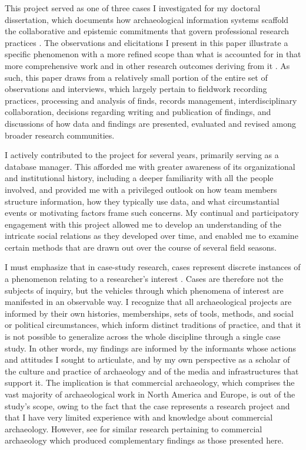 \documentclass{article}
\begin{document}
This project served as one of three cases I investigated for my doctoral
dissertation, which documents how archaeological information systems
scaffold the collaborative and epistemic commitments that govern
professional research practices \parencite{batist2023a}. The observations
and elicitations I present in this paper illustrate a specific
phenomenon with a more refined scope than what is accounted for in that
more comprehensive work and in other research outcomes deriving from it
\parencites[cf.][]{batist2021}{batist2024a}{batist-alienation}. As such,
this paper draws from a relatively small portion of the entire set of
observations and interviews, which largely pertain to fieldwork
recording practices, processing and analysis of finds, records
management, interdisciplinary collaboration, decisions regarding writing
and publication of findings, and discussions of how data and findings
are presented, evaluated and revised among broader research communities.

I actively contributed to the project for several years, primarily
serving as a database manager. This afforded me with greater awareness
of its organizational and institutional history, including a deeper
familiarity with all the people involved, and provided me with a
privileged outlook on how team members structure information, how they
typically use data, and what circumstantial events or motivating factors
frame such concerns. My continual and participatory engagement with this
project allowed me to develop an understanding of the intricate social
relations as they developed over time, and enabled me to examine certain
methods that are drawn out over the course of several field seasons.

I must emphasize that in case-study research, cases represent discrete
instances of a phenomenon relating to a researcher's interest
\parencite{ragin1992}. Cases are therefore not the subjects of inquiry,
but the vehicles through which phenomena of interest are manifested in
an observable way. I recognize that all archaeological projects are
informed by their own histories, memberships, sets of tools, methods,
and social or political circumstances, which inform distinct traditions
of practice, and that it is not possible to generalize across the whole
discipline through a single case study. In other words, my findings are
informed by the informants whose actions and attitudes I sought to
articulate, and by my own perspective as a scholar of the culture and
practice of archaeology and of the media and infrastructures that
support it. The implication is that commercial archaeology, which
comprises the vast majority of archaeological work in North America and
Europe, is out of the study's scope, owing to the fact that the case
represents a research project and that I have very limited experience
with and knowledge about commercial archaeology. However, see
\textcites{chadwick1998}{thorpe2012}{zorzin2015}
for similar research pertaining to commercial archaeology which produced
complementary findings as those presented here.
\end{document}
